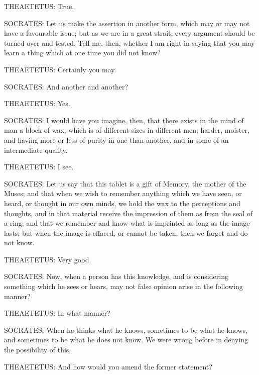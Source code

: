 THEAETETUS: True.

SOCRATES: Let us make the assertion in another form, which may or may
not have a favourable issue; but as we are in a great strait, every
argument should be turned over and tested. Tell me, then, whether I am
right in saying that you may learn a thing which at one time you did not
know?

THEAETETUS: Certainly you may.

SOCRATES: And another and another?

THEAETETUS: Yes.

SOCRATES: I would have you imagine, then, that there exists in the mind
of man a block of wax, which is of different sizes in different men;
harder, moister, and having more or less of purity in one than another,
and in some of an intermediate quality.

THEAETETUS: I see.

SOCRATES: Let us say that this tablet is a gift of Memory, the mother
of the Muses; and that when we wish to remember anything which we have
seen, or heard, or thought in our own minds, we hold the wax to the
perceptions and thoughts, and in that material receive the impression of
them as from the seal of a ring; and that we remember and know what is
imprinted as long as the image lasts; but when the image is effaced, or
cannot be taken, then we forget and do not know.

THEAETETUS: Very good.

SOCRATES: Now, when a person has this knowledge, and is considering
something which he sees or hears, may not false opinion arise in the
following manner?

THEAETETUS: In what manner?

SOCRATES: When he thinks what he knows, sometimes to be what he knows,
and sometimes to be what he does not know. We were wrong before in
denying the possibility of this.

THEAETETUS: And how would you amend the former statement?

